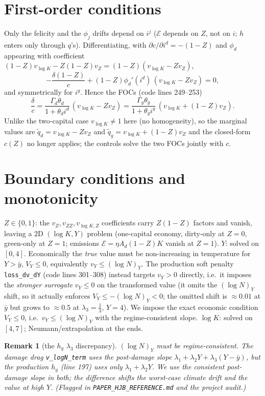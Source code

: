 \documentclass[11pt]{article}
\newtheorem{remark}{Remark}
\newcommand{\E}{\mathcal E}
\begin{document}
\section{First-order conditions}

Only the felicity and the $\phi_j$ drifts depend on $i^j$ ($\E$ depends on $Z$, not on $i$;
$h$ enters only through $q$'s). Differentiating, with $\partial c/\partial i^d=-(1-Z)$ and
$\phi_d$ appearing with coefficient $(1-Z)v_{\log K}-Z(1-Z)v_Z=(1-Z)(v_{\log K}-Zv_Z)$,
\[
-\frac{\delta(1-Z)}{c}+(1-Z)\phi_d'(i^d)\,(v_{\log K}-Z v_Z)=0,
\]
and symmetrically for $i^g$. Hence the FOCs (code lines 249--253)
\[
\boxed{\;
\frac{\delta}{c}=\frac{\Gamma_d\theta_d}{1+\theta_d i^d}\,(v_{\log K}-Z v_Z)
=\frac{\Gamma_g\theta_g}{1+\theta_g i^g}\,(v_{\log K}+(1-Z)v_Z).
\;}
\]
Unlike the two-capital case $v_{\log K}\neq1$ here (no homogeneity), so the marginal values
are $\tilde q_d=v_{\log K}-Zv_Z$ and $\tilde q_g=v_{\log K}+(1-Z)v_Z$ and the closed-form
$c(Z)$ no longer applies; the controls solve the two FOCs jointly with $c$.

\section{Boundary conditions and monotonicity}

\textbf{$Z\in\{0,1\}$}: the $v_Z,v_{ZZ},v_{\log K,Z}$ coefficients carry $Z(1-Z)$ factors and
vanish, leaving a $2$D $(\log K,Y)$ problem (one-capital economy, dirty-only at $Z=0$,
green-only at $Z=1$; emissions $\E=\eta A_d(1-Z)K$ vanish at $Z=1$). \textbf{$Y$}: solved on
$[0,4]$. Economically the \emph{true} value must be non-increasing in temperature for
$Y>\bar y$, $V_Y\le0$, equivalently $v_Y\le(\log N)_Y$. The production soft penalty
\texttt{loss\_dv\_dY} (code lines 301--308) instead targets $v_Y>0$ directly, i.e.\ it imposes
the \emph{stronger surrogate} $v_Y\le0$ on the transformed value (it omits the $(\log N)_Y$
shift, so it actually enforces $V_Y\le-(\log N)_Y<0$; the omitted shift is $\approx0.01$ at
$\bar y$ but grows to $\approx0.5$ at $\lambda_3=\tfrac13,\,Y=4$). We impose the exact economic
condition $V_Y\le0$, i.e.\ $v_Y\le(\log N)_Y$ with the regime-consistent slope.
\textbf{$\log K$}: solved on $[4,7]$; Neumann/extrapolation at the ends.

\begin{remark}[the $h_y$ $\lambda_3$ discrepancy]\label{rem:hy}
$(\log N)_Y$ must be regime-consistent. The damage drag \texttt{v\_logN\_term} uses the
post-damage slope $\lambda_1+\lambda_2Y+\lambda_3(Y-\bar y)$, but the production $h_y$
(line 197) uses only $\lambda_1+\lambda_2Y$. We use the consistent post-damage slope in both;
the difference shifts the worst-case climate drift and the value at high $Y$. (Flagged in
\texttt{PAPER\_HJB\_REFERENCE.md} and the project audit.)
\end{remark}
\end{document}
